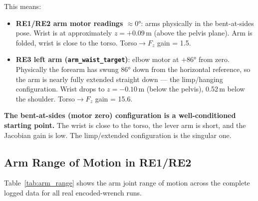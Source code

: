 \documentclass[11pt,a4paper]{article}
\begin{document}
This means:
\begin{itemize}
\item \textbf{RE1/RE2 arm motor readings $\approx 0°$}: arms physically in
  the bent-at-sides pose.  Wrist is at approximately $z = +0.09$\,m (above
  the pelvis plane).  Arm is folded, wrist is close to the torso.
  Torso$\to$$F_z$ gain = 1.5.

\item \textbf{RE3 left arm (\texttt{arm\_waist\_target})}: elbow motor at
  $+86°$ from zero.  Physically the forearm has swung $86°$ down from the
  horizontal reference, so the arm is nearly fully extended straight down
  --- the limp/hanging configuration.  Wrist drops to
  $z = -0.10$\,m (below the pelvis), 0.52\,m below the shoulder.
  Torso$\to$$F_z$ gain = 15.6.
\end{itemize}

\noindent\textbf{The bent-at-sides (motor zero) configuration is a
well-conditioned starting point.}  The wrist is close to the torso, the
lever arm is short, and the Jacobian gain is low.  The limp/extended
configuration is the singular one.

\subsection{Arm Range of Motion in RE1/RE2}

Table~\ref{tab:arm_range} shows the arm joint range of motion across the
complete logged data for all real encoded-wrench runs.
\end{document}
